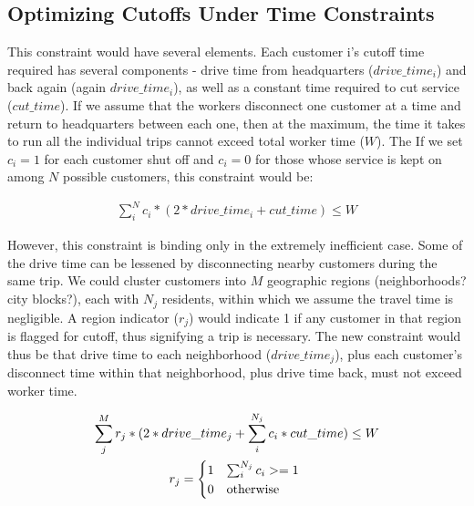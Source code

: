 \documentclass[]{article}
\begin{document}
\begin{large}
\section{Optimizing Cutoffs Under Time Constraints}

This constraint would have several elements. Each customer i's cutoff time required has several components - drive time from headquarters ($drive\_time_i$) and back again (again $drive\_time_i$), as well as a constant time required to cut service ($cut\_time$). If we assume that the workers disconnect one customer at a time and return to headquarters between each one, then at the maximum, the time it takes to run all the individual trips cannot exceed total worker time ($W$). The If we set $c_i = 1$ for each customer shut off and $c_i = 0$ for those whose service is kept on among $N$ possible customers, this constraint would be:


\begin{gather*}
\sum_{i}^{N}c_i*(2*drive\_time_i + cut\_time) \leq W
\end{gather*}

However, this constraint is binding only in the extremely inefficient case. Some of the drive time can be lessened by disconnecting nearby customers during the same trip. We could cluster customers into $M$ geographic regions (neighborhoods? city blocks?), each with $N_j$ residents, within which we assume the travel time is negligible. A region indicator ($r_j$) would indicate 1 if any customer in that region is flagged for cutoff, thus signifying a trip is necessary. The new constraint would thus be that drive time to each neighborhood ($drive\_time_j$), plus each customer's disconnect time within that neighborhood, plus drive time back, must not exceed worker time.

\begin{gather*}
\sum_{j}^{M} r_j * (2 * drive\_time_j + \sum_{i}^{N_j} c_i * cut\_time) \leq W \\
r_j = \begin{dcases*}
1 & $\sum_{i}^{N_j}c_i >= 1$ \\
0 & otherwise
\end{dcases*}
\end{gather*} 

\end{large}
\end{document}
